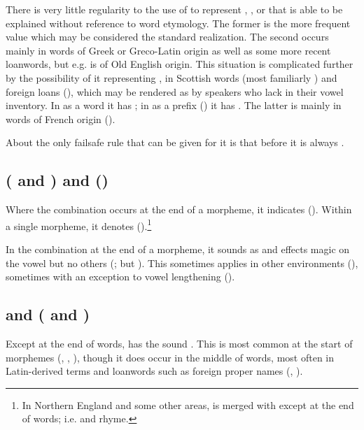 There is very little regularity to the use of  to represent ,
, or  that is able to be explained without reference to word
etymology. The former is the more frequent value which may be considered the
standard realization. The second occurs mainly in words of Greek or Greco-Latin
origin as well as some more recent loanwords, but e.g.  is of Old
English origin. This situation is complicated further by the possibility of it
representing , in Scottish words (most familiarly ) and foreign
loans (), which may be rendered as  by speakers who lack
 in their vowel inventory. In  as a word it has ; in
 as a prefix () it has . The latter is
mainly in words of French origin ().

About the only failsafe rule that can be given for it is that before  it
is always .

\subsection{ ( and ) and  ()}

Where the combination  occurs at the end of a morpheme, it indicates
 (). Within a single morpheme, it denotes 
().\footnote{In Northern England and some other areas,
 is merged with  except at the end of words; i.e.  and
 rhyme.}

In the combination  at the end of a morpheme, it sounds as  and
effects magic  on the vowel  but no others (; but
). This sometimes applies in other environments
(), sometimes with an exception to vowel lengthening
().

\subsection{ and  ( and )}

Except at the end of words,  has the sound . This is most common at
the start of morphemes (, , ), though it does occur
in the middle of words, most often in Latin-derived terms and loanwords such as
foreign proper names (, ).

